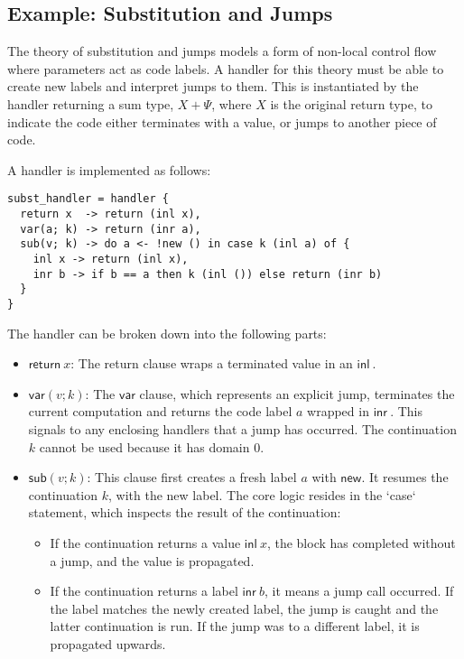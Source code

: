 \documentclass{article}
\theoremstyle{definition}
\theoremstyle{remark}
\newcommand\new{\mathsf{new}}
\newcommand\ret[1]{{\mathsf{return} \ #1}}
\newcommand\sub{\mathsf{sub}}
\newcommand\var{\mathsf{var}}
\newcommand\inl[1]{{\mathsf{inl} \ #1}}
\newcommand\inr[1]{{\mathsf{inr} \ #1}}
\begin{document}
\subsection{Example: Substitution and Jumps}

The theory of substitution and jumps models a form of non-local control flow where parameters act as code labels.
A handler for this theory must be able to create new labels and interpret jumps to them.
This is instantiated by the handler returning a sum type, $X + \Psi$, where $X$ is the original return type, to indicate the code either terminates with a value, or jumps to another piece of code.

A handler is implemented as follows:

\begin{lstlisting}
subst_handler = handler {
  return x  -> return (inl x),
  var(a; k) -> return (inr a),
  sub(v; k) -> do a <- !new () in case k (inl a) of {
    inl x -> return (inl x),
    inr b -> if b == a then k (inl ()) else return (inr b)
  }
}
\end{lstlisting}

The handler can be broken down into the following parts:
\begin{itemize}
    \item $\ret{x}$: The return clause wraps a terminated value in an $\inl{}$.
    \item $\var(v; k)$: The $\var$ clause, which represents an explicit jump, terminates the current computation and returns the code label $a$ wrapped in $\inr{}$.
      This signals to any enclosing handlers that a jump has occurred. The continuation $k$ cannot be used because it has domain $0$.
    \item $\sub(v; k)$: This clause first creates a fresh label $a$ with $\new$. It resumes the continuation $k$, with the new label.
      The core logic resides in the `case` statement, which inspects the result of the continuation:
      \begin{itemize}
          \item If the continuation returns a value $\inl x$, the block has completed without a jump, and the value is propagated.
          \item If the continuation returns a label $\inr b$, it means a jump call occurred. If the label matches the newly created label, the jump is caught and the latter continuation is run.
            If the jump was to a different label, it is propagated upwards.
      \end{itemize}
\end{itemize}
\end{document}
